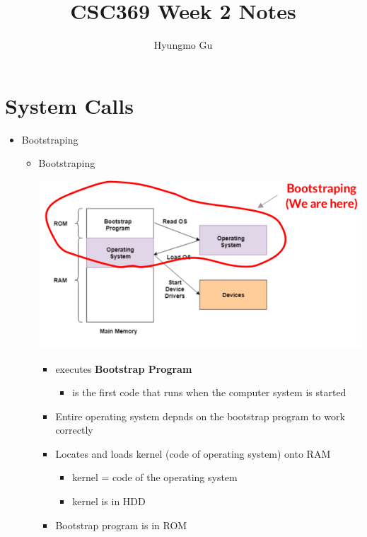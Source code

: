 \documentclass[12pt]{article}
\begin{document}
\title{CSC369 Week 2 Notes}
\author{Hyungmo Gu}
\maketitle

\section{System Calls}

\bigskip

\begin{itemize}
    \item Bootstraping
    \begin{itemize}
        \item Bootstraping

        \begin{center}
        \includegraphics[width=\linewidth]{images/week_2_notes_1_3.png}
        \end{center}


        \begin{itemize}
            \item executes \textbf{Bootstrap Program}
            \begin{itemize}
                \item is the first code that runs when the computer system is started
            \end{itemize}
            \item Entire operating system depnds on the bootstrap program to work
            correctly
            \item Locates and loads kernel (code of operating system) onto RAM
            \begin{itemize}
                \item kernel = code of the operating system
                \item kernel is in HDD
            \end{itemize}
            \item Bootstrap program is in ROM
        \end{itemize}


\end{itemize}
\end{itemize}
\end{document}
